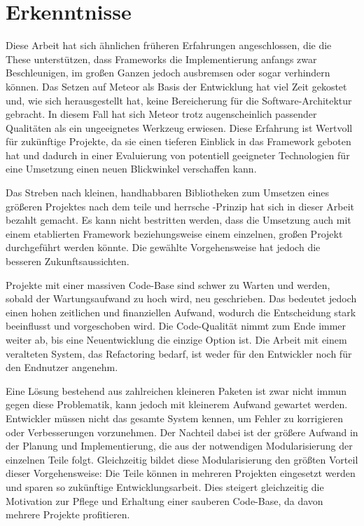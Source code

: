 \section{Erkenntnisse}
\label{sec:d_erkenntnisse}

Diese Arbeit hat sich ähnlichen früheren Erfahrungen angeschlossen, die die
These unterstützen, dass Frameworks die Implementierung anfangs zwar
Beschleunigen, im großen Ganzen jedoch ausbremsen oder sogar verhindern können.
Das Setzen auf Meteor als Basis der Entwicklung hat viel Zeit gekostet und, wie
sich herausgestellt hat, keine Bereicherung für die Software-Architektur
gebracht.  In diesem Fall hat sich Meteor trotz augenscheinlich passender
Qualitäten als ein ungeeignetes Werkzeug erwiesen.  Diese Erfahrung ist
Wertvoll für zukünftige Projekte, da sie einen tieferen Einblick in das
Framework geboten hat und dadurch in einer Evaluierung von potentiell geeigneter
Technologien für eine Umsetzung einen neuen Blickwinkel verschaffen kann.

Das Streben nach kleinen, handhabbaren Bibliotheken zum Umsetzen eines
größeren Projektes nach dem teile und herrsche -Prinzip hat sich in dieser
Arbeit bezahlt gemacht.  Es kann nicht bestritten werden, dass die Umsetzung
auch mit einem etablierten Framework beziehungsweise einem einzelnen, großen
Projekt durchgeführt werden könnte.  Die gewählte Vorgehensweise hat jedoch
die besseren Zukunftsaussichten.

Projekte mit einer massiven Code-Base sind schwer zu Warten und werden, sobald
der Wartungsaufwand zu hoch wird, neu geschrieben.  Das bedeutet jedoch einen
hohen zeitlichen und finanziellen Aufwand, wodurch die Entscheidung stark
beeinflusst und vorgeschoben wird.  Die Code-Qualität nimmt zum Ende immer
weiter ab, bis eine Neuentwicklung die einzige Option ist.  Die Arbeit mit
einem veralteten System, das Refactoring bedarf, ist weder für den Entwickler
noch für den Endnutzer angenehm.

Eine Lösung bestehend aus zahlreichen kleineren Paketen ist zwar nicht immun
gegen diese Problematik, kann jedoch mit kleinerem Aufwand gewartet werden.
Entwickler müssen nicht das gesamte System kennen, um Fehler zu korrigieren
oder Verbesserungen vorzunehmen.  Der Nachteil dabei ist der größere Aufwand 
in der Planung und Implementierung, die aus der notwendigen Modularisierung der
einzelnen Teile folgt.  Gleichzeitig bildet diese Modularisierung
den größten Vorteil dieser Vorgehensweise:  Die Teile können in mehreren
Projekten eingesetzt werden und sparen so zukünftige Entwicklungsarbeit.
Dies steigert gleichzeitig die Motivation zur Pflege und Erhaltung einer
sauberen Code-Base, da davon mehrere Projekte profitieren.


